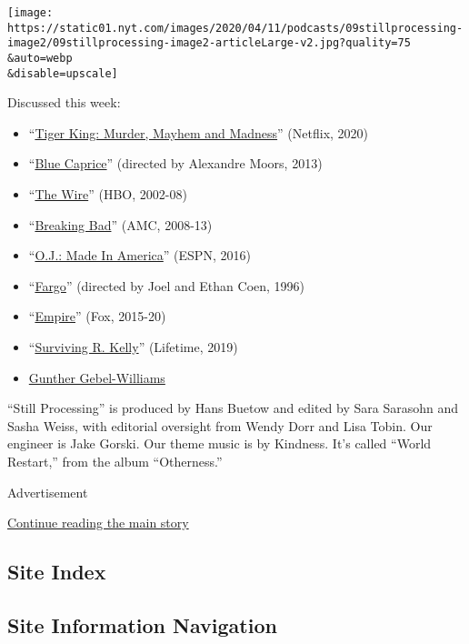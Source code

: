 \texttt{[image: https://static01.nyt.com/images/2020/04/11/podcasts/09stillprocessing-image2/09stillprocessing-image2-articleLarge-v2.jpg?quality=75\\\&auto=webp\\\&disable=upscale]}

Discussed this week:

\begin{itemize}
\item
  ``\href{https://www.netflix.com/title/81115994}{Tiger King: Murder,
  Mayhem and Madness}'' (Netflix, 2020)
\item
  ``\href{https://www.imdb.com/title/tt2027064/}{Blue Caprice}''
  (directed by Alexandre Moors, 2013)
\item
  ``\href{https://www.imdb.com/title/tt0306414/}{The Wire}'' (HBO,
  2002-08)
\item
  ``\href{https://www.imdb.com/title/tt0903747/}{Breaking Bad}'' (AMC,
  2008-13)
\item
  ``\href{https://www.imdb.com/title/tt5275892/}{O.J.: Made In
  America}'' (ESPN, 2016)
\item
  ``\href{https://www.imdb.com/title/tt0116282/}{Fargo}'' (directed by
  Joel and Ethan Coen, 1996)
\item
  ``\href{https://www.imdb.com/title/tt3228904/}{Empire}'' (Fox,
  2015-20)
\item
  ``\href{https://www.imdb.com/title/tt8385496/}{Surviving R. Kelly}''
  (Lifetime, 2019)
\item
  \href{https://www.google.com/search?q=gunther+gebel+williams\&client=safari\&rls=en\&sxsrf=ALeKk02wBMUiTlTj1jh_juFOVUu_Z1hPiw:1586204061513\&source=lnms\&tbm=isch\&sa=X\&ved=2ahUKEwjft4LNztToAhXvmOAKHXNADh0Q_AUoAnoECBYQBA\&biw=1694\&bih=957}{Gunther
  Gebel-Williams}
\end{itemize}

``Still Processing'' is produced by Hans Buetow and edited by Sara
Sarasohn and Sasha Weiss, with editorial oversight from Wendy Dorr and
Lisa Tobin. Our engineer is Jake Gorski. Our theme music is by Kindness.
It's called ``World Restart,'' from the album ``Otherness.''

Advertisement

\protect\hyperlink{after-bottom}{Continue reading the main story}

\hypertarget{site-index}{%
\subsection{Site Index}\label{site-index}}

\hypertarget{site-information-navigation}{%
\subsection{Site Information
Navigation}\label{site-information-navigation}}

